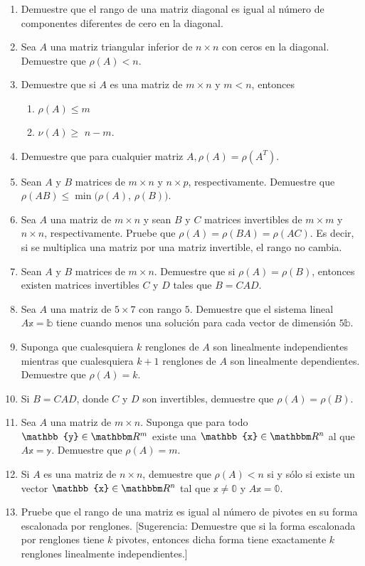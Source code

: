\begin{enumerate}[start=81]
    \item Demuestre que el rango de una matriz diagonal es igual al número de componentes diferentes de cero en la diagonal.
    \item Sea $A$ una matriz triangular inferior de $n \times n$ con ceros en la diagonal. Demuestre que $\rho(A)<n$.
    \item Demuestre que si $A$ es una matriz de $m \times n$ y $m<n$, entonces
    \begin{enumerate}
        \item $\rho(A) \leq m$
        \item $\nu(A) \geq$ $n-m$.
    \end{enumerate}
    \item Demuestre que para cualquier matriz $A, \rho(A)=\rho\left(A^{T}\right)$.
    \item Sean $A$ y $B$ matrices de $m \times n$ y $n \times p$, respectivamente. Demuestre que $\rho(A B) \leq \min\big(\rho(A)$, $\rho(B)\big)$.
    \item Sea $A$ una matriz de $m \times n$ y sean $B$ y $C$ matrices invertibles de $m \times m$ y $n \times n$, respectivamente. Pruebe que $\rho(A)=\rho(B A)=\rho(A C)$. Es decir, si se multiplica una matriz por una matriz invertible, el rango no cambia.
    \item Sean $A$ y $B$ matrices de $m \times n$. Demuestre que si $\rho(A)=\rho(B)$, entonces existen matrices invertibles $C$ y $D$ tales que $B=C A D$.
    \item Sea $A$ una matriz de $5 \times 7$ con rango $5$. Demuestre que el sistema lineal $A \mathbb{x}=\mathbb{b}$ tiene cuando menos una solución para cada vector de dimensión $5 \mathbb{b}$.
    \item Suponga que cualesquiera $k$ renglones de $A$ son linealmente independientes mientras que cualesquiera $k+1$ renglones de $A$ son linealmente dependientes. Demuestre que $\rho(A)=k$.
    \item Si $B=C A D$, donde $C$ y $D$ son invertibles, demuestre que $\rho(A)=\rho(B)$.
    \item Sea $A$ una matriz de $m \times n$. Suponga que para todo $\mathbb{y} \in \RR[m]$ existe una $\mathbb{x} \in \RR[n]$ al que $A \mathbb{x}=\mathbb{y}$. Demuestre que $\rho(A)=m$.
    \item Si $A$ es una matriz de $n \times n$, demuestre que $\rho(A)<n$ si y sólo si existe un vector $\mathbb{x} \in \RR[n]$ tal que $\mathbb{x} \neq \mathbb{0}$ y $A \mathbb{x}=\mathbb{0}$.
    \item Pruebe que el rango de una matriz es igual al número de pivotes en su forma escalonada por renglones. [Sugerencia: Demuestre que si la forma escalonada por renglones tiene $k$ pivotes, entonces dicha forma tiene exactamente $k$ renglones linealmente independientes.]
\end{enumerate}
